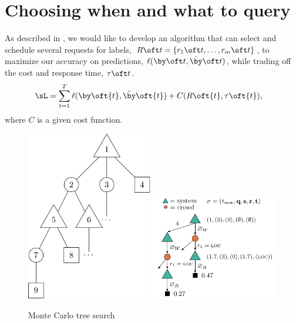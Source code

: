 \section{Choosing when and what to query}
\label{sec:async}

As described in ,
we would like to develop an algorithm that can select and schedule several requests for labels, $R\oft t = \{r_1\oft t, \ldots, r_m\oft t\}$, to maximize our accuracy on predictions, $\ell(\by\oft t, \byt\oft t)$, while trading off the cost and response time, $\tau\oft t$. 
\begin{align*}
  \sL &= \sum_{t=1}^T \ell(\by\oft{t}, \byt\oft{t}) + C(R\oft{t}, \tau\oft{t}),
\end{align*}
where $C$ is a given cost function.

\begin{figure}
  \includegraphics[width=0.49\textwidth,height=0.23\textheight,keepaspectratio]{figures/mcts.pdf}
  \hfill
  \includegraphics[width=0.49\textwidth,height=0.23\textheight,keepaspectratio]{figures/mcts_simple.pdf}
  \caption{Monte Carlo tree search}
\label{fig:mcts}
\end{figure}

